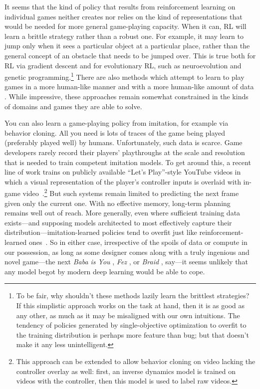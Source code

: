 \documentclass[runningheads]{llncs}
\begin{document}
It seems that the kind of policy that results from reinforcement learning on individual games neither creates nor relies on the kind of representations that would be needed for more general game-playing capacity. When it can, RL will learn a brittle strategy rather than a robust one. For example, it may learn to jump only when it sees a particular object at a particular place, rather than the general concept of an obstacle that needs to be jumped over. This is true both for RL via gradient descent and for evolutionary RL, such as neuroevolution and genetic programming.\footnote{To be fair, why shouldn't these methods lazily learn the brittlest strategies? If this simplistic approach works on the task at hand, then it is as good as any other, as much as it may be misaligned with our own intuitions. The tendency of policies generated by single-objective optimization to overfit to the training distribution is perhaps more feature than bug; but that doesn't make it any less unintelligent.} There are also methods which attempt to learn to play games in a more human-like manner and with a more human-like amount of data \cite{tsividis2021human,ahmedsynthesizing}. While impressive, these approaches remain somewhat constrained in the kinds of domains and games they are able to solve.

You can also learn a game-playing policy from imitation, for example via behavior cloning. All you need is lots of traces of the game being played (preferably played well) by humans. Unfortunately, such data is scarce. Game developers rarely record their players' playthroughs at the scale and resolution that is needed to train competent imitation models. To get around this, a recent line of work trains on publicly available ``Let's Play''-style YouTube videos in which a visual representation of the player's controller inputs is overlaid with in-game video~\cite{magne2026nitrogen,yue2025pixels,ravsajski2024behave,ravsajski2026Inv}.\footnote{This approach can be extended to allow behavior cloning on video lacking the controller overlay as well: first, an inverse dynamics model is trained on videos with the controller, then this model is used to label raw videos.} But such systems remain limited to predicting the next frame given only the current one. With no effective memory, long-term planning remains well out of reach. More generally, even where sufficient training data exists---and supposing models architected to most effectively capture their distribution---imitation-learned policies tend to overfit just like reinforcement-learned ones~\cite{togelius2007towards,gavenski2025quantifying}.
So in either case, irrespective of the spoils of data or compute in our possession, as long as some designer comes along with a truly ingenious and novel game---the next \textit{Baba is You} \cite{baba_is_you}, \textit{Fez} \cite{fez}, or \textit{Braid} \cite{braid}, say---it seems unlikely that any model begot by modern deep learning would be able to cope.
\end{document}
